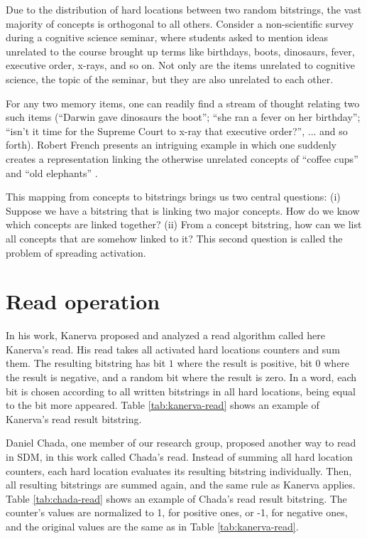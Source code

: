 Due to the distribution of hard locations between two random bitstrings, the vast majority of concepts is orthogonal to all others. Consider a non-scientific survey during a cognitive science seminar, where students asked to mention ideas unrelated to the course brought up terms like birthdays, boots, dinosaurs, fever, executive order, x-rays, and so on. Not only are the items unrelated to cognitive science, the topic of the seminar, but they are also unrelated to each other.

For any two memory items, one can readily find a stream of thought relating two such items (``Darwin gave dinosaurs the boot''; ``she ran a fever on her birthday''; ``isn't it time for the Supreme Court to x-ray that executive order?'', ... and so forth). Robert French presents an intriguing example in which one suddenly creates a representation linking the otherwise unrelated concepts of ``coffee cups'' and ``old elephants'' \citep{French1997}.

This mapping from concepts to bitstrings brings us two central questions: (i) Suppose we have a bitstring that is linking two major concepts.  How do we know which concepts are linked together? (ii) From a concept bitstring, how can we list all concepts that are somehow linked to it? This second question is called the problem of spreading activation.


\section{Read operation}

In his work, Kanerva proposed and analyzed a read algorithm called here Kanerva's read. His read takes all activated hard locations counters and sum them. The resulting bitstring has bit $1$ where the result is positive, bit $0$ where the result is negative, and a random bit where the result is zero. In a word, each bit is chosen according to all written bitstrings in all hard locations, being equal to the bit more appeared. Table \ref{tab:kanerva-read} shows an example of Kanerva's read result bitstring.

Daniel Chada, one member of our research group, proposed another way to read in SDM, in this work called Chada's read. Instead of summing all hard location counters, each hard location evaluates its resulting bitstring individually. Then, all resulting bitstrings are summed again, and the same rule as Kanerva applies. Table \ref{tab:chada-read} shows an example of Chada's read result bitstring. The counter's values are normalized to 1, for positive ones, or -1, for negative ones, and the original values are the same as in Table \ref{tab:kanerva-read}.

